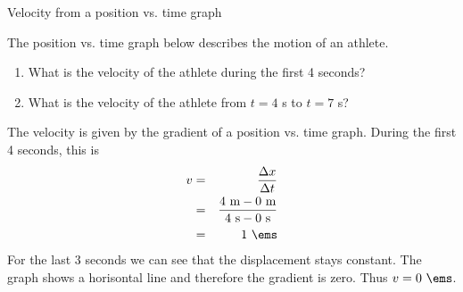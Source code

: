     \noindent
\par
\begin{wex}{Velocity from a position vs. time graph}
{The position vs. time graph below describes the motion of an athlete.
\begin{enumerate}[label=\textbf{\arabic*}.]
\item What is the velocity of the athlete during the first 4 seconds?
\item What is the velocity of the athlete from $t=4$ s to $t=7$ s?
\end{enumerate}

\begin{center}
\end{center}}
{
The velocity is given by the gradient of a position vs. time graph. During the first 4 seconds, this is
\begin{eqnarray*}
{v}&=&\frac{\Delta x}{\Delta t}\\
&=&\frac{4\text{~m} - 0\text{~m}}{4\text{~s} - 0\text{~s}}\\
&=&1\ \ems
\end{eqnarray*}
For the last 3 seconds we can see that the displacement stays constant. The graph shows a horisontal line and therefore the gradient is zero. Thus ${v}=0\ \ems$.}
\end{wex} 
    \noindent 
